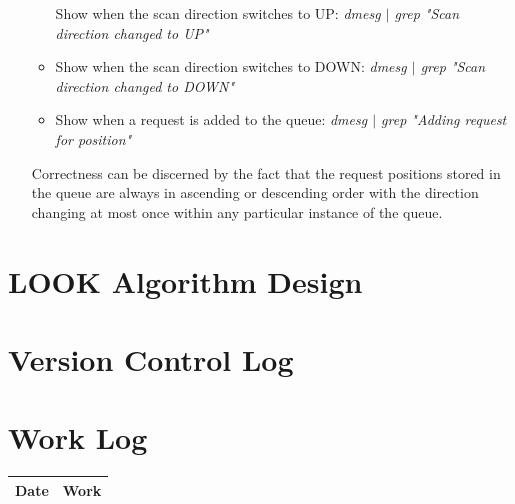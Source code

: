 \documentclass[onecolumn,draftclsnofoot, 10pt, compsoc]{IEEEtran}
\begin{document}
\begin{enumerate}
\begin{itemize}
					Show when the scan direction switches to UP: \textit{dmesg $|$ grep "Scan direction changed to UP"}
				\item 
					Show when the scan direction switches to DOWN: \textit{dmesg $|$ grep "Scan direction changed to DOWN"}
				\item
					Show when a request is added to the queue: \textit{dmesg $|$ grep "Adding request for position"}
			\end{itemize}
			Correctness can be discerned by the fact that the request positions stored in the queue are always in ascending or descending order with the direction changing at most once within any particular instance of the queue.
	\end{enumerate}


\section{LOOK Algorithm Design}
\section{Version Control Log}


\section{Work Log}
	\begin{center}
		\begin{tabular}{ |p{2cm}|p{12cm}| }
			\hline
			Date & Work \\
			\hline
		\end{tabular}
	\end{center}


\bibdata{}


\end{document}
